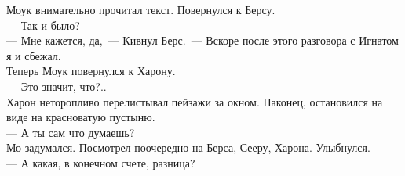\noindent Моук внимательно прочитал текст. Повернулся к Берсу.\\
--- Так и было?\\
--- Мне кажется, да,~--- Кивнул Берс.~--- Вскоре после этого разговора с Игнатом 
я и сбежал.\\
Теперь Моук повернулся к Харону.\\
--- Это значит, что?..\\
Харон неторопливо перелистывал пейзажи за окном. Наконец, остановился на виде 
на красноватую пустыню. \\
--- А ты сам что думаешь?\\
Мо задумался. Посмотрел поочередно на Берса, Сееру, Харона. Улыбнулся.\\
--- А какая, в конечном счете, разница?  
